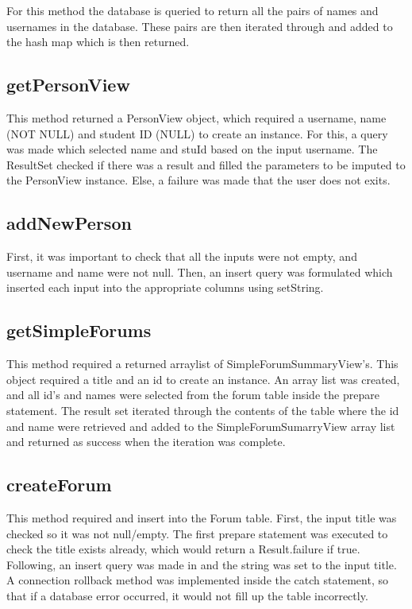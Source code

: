 \documentclass{article}
\begin{document}
For this method the database is queried to return all the pairs of names and usernames in the database. These pairs are then iterated through and added to the hash map which is then returned.

\subsection*{getPersonView}

This method returned a PersonView object, which required a username, name (NOT NULL) and student ID (NULL) to create an instance. For this, a query was made which selected name and stuId based on the input username. The ResultSet checked if there was a result and filled the parameters to be imputed to the PersonView instance. Else, a failure was made that the user does not exits.

\subsection*{addNewPerson}

First, it was important to check that all the inputs were not empty, and username and name were not null. Then, an insert query was formulated which inserted each input into the appropriate columns using setString.

\subsection*{getSimpleForums}

This method required a returned arraylist of SimpleForumSummaryView's. This object required a title and an id to create an instance. An array list was created, and all id's and names were selected from the forum table inside the prepare statement. The result set iterated through the contents of the table where the id and name were retrieved and added to the SimpleForumSumarryView array list and returned as success when the iteration was complete.
\subsection*{createForum}

This method required and insert into the Forum table. First, the input title was checked so it was not null/empty. The first prepare statement was executed to check the title exists already, which would return a Result.failure if true. Following, an insert query was made in and the string was set to the input title. A connection rollback method was implemented inside the catch statement, so that if a database error occurred, it would not fill up the table incorrectly.
\end{document}
